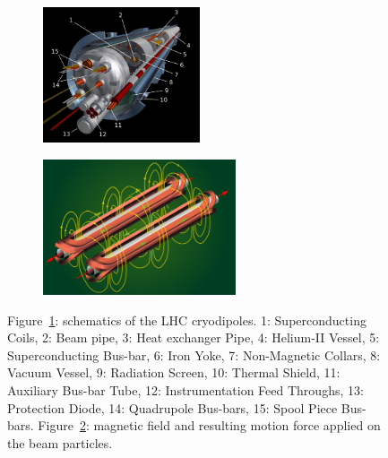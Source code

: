 	\begin{figure}[H]
		\begin{subfigure}{0.5\linewidth}
			\centering
			\includegraphics[height = 4cm]{fig/chapt2/LHC-dipole.png}
			\caption{\label{fig:LHCDipole:A}}
		\end{subfigure}
		\begin{subfigure}{0.5\linewidth}
			\centering
			\includegraphics[height = 4cm]{fig/chapt2/LHC-dipole-field.jpg}
			\caption{\label{fig:LHCDipole:B}}
		\end{subfigure}
		\caption{\label{fig:LHCDipole} Figure~\ref{fig:LHCDipole:A}: schematics of the LHC cryodipoles. 1: Superconducting Coils, 2: Beam pipe, 3: Heat exchanger Pipe, 4: Helium-II Vessel, 5: Superconducting Bus-bar, 6: Iron Yoke, 7: Non-Magnetic Collars, 8: Vacuum Vessel, 9: Radiation Screen, 10: Thermal Shield, 11: Auxiliary Bus-bar Tube, 12: Instrumentation Feed Throughs, 13: Protection Diode, 14: Quadrupole Bus-bars, 15: Spool Piece Bus-bars. Figure~\ref{fig:LHCDipole:B}: magnetic field and resulting motion force applied on the beam particles.}
	\end{figure}
	
